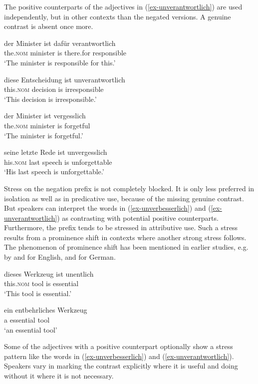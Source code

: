 \documentclass[output=paper
  ,nobabel
  ,draftmode
  ,colorlinks, citecolor=brown
]{langscibook}
\begin{document}
\noindent The positive counterparts of the adjectives in (\ref{ex-unverantwortlich}) are used independently, but in other contexts than the negated versions. A genuine contrast is absent once more.

\eal
\ex
\gll der              Minister ist dafür     verantwortlich \\
     the.\textsc{nom} minister is  there.for responsible \\
\glt `The minister is responsible for this.'

\ex
\gll diese Entscheidung ist unverantwortlich \\
	this.\textsc{nom} decision is irresponsible\\
\glt `This decision is irresponsible.'
\zl


\eal
\ex
\gll der Minister ist vergesslich \\
	the.\textsc{nom} minister is forgetful\\
\glt `The minister is forgetful.'

\ex
\gll seine letzte Rede ist unvergesslich \\
	his.\textsc{nom} last speech is unforgettable\\
\glt `His last speech is unforgettable.'
\zl

\noindent Stress on the negation prefix is not completely blocked. It is only less preferred in isolation as well as in predicative use, because of the missing genuine contrast. But speakers can interpret the words in (\ref{ex-unverbesserlich}) and (\ref{ex-unverantwortlich}) as contrasting with potential positive counterparts. Furthermore, the prefix tends to be stressed in attributive use. Such a stress results from a prominence shift in contexts where another strong stress follows. The phenomenon of prominence shift has been mentioned in earlier studies, e.g. by \citet{ChomskyHalle1968} and \citet{Selkirk1995} for English, and \citet{Wiese1996} for German.

\eal
\ex
\gll dieses Werkzeug ist unentlich \\
this.\textsc{nom} tool is essential \\
\glt `This tool is essential.'

\ex
\gll ein entbehrliches Werkzeug \\
	a essential tool\\
\glt `an essential tool'
\zl

\largerpage
\noindent 
Some of the adjectives with a positive counterpart optionally show a stress pattern like the words in (\ref{ex-unverbesserlich}) and (\ref{ex-unverantwortlich}). Speakers vary in marking the contrast explicitly where it is useful and doing without it where it is not necessary. 
\end{document}
